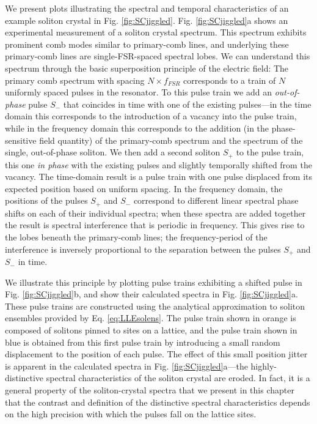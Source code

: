 We present plots illustrating the spectral and temporal characteristics of an example soliton crystal in Fig. \ref{fig:SCjiggled}. Fig. \ref{fig:SCjiggled}a shows an experimental measurement of a soliton crystal spectrum. This spectrum exhibits prominent comb modes similar to primary-comb lines, and underlying these primary-comb lines are single-FSR-spaced spectral lobes. We can understand this spectrum through the basic superposition principle of the electric field: The primary comb spectrum with spacing $N\times f_{FSR}$ corresponds to a train of $N$ uniformly spaced pulses in the resonator. To this pulse train we add an \textit{out-of-phase} pulse $S_-$ that coincides in time with one of the existing pulses---in the time domain this corresponds to the introduction of a vacancy into the pulse train, while in the frequency domain this corresponds to the addition (in the phase-sensitive field quantity) of the primary-comb spectrum and the spectrum of the single, out-of-phase soliton. We then add a second soliton $S_+$  to the pulse train, this one \textit{in phase} with the existing pulses and slightly temporally shifted from the vacancy. The time-domain result is a pulse train with one pulse displaced from its expected position based on uniform spacing. In the frequency domain, the positions of the pulses $S_+$ and $S_-$ correspond to different linear spectral phase shifts on each of their individual spectra; when these spectra are added together the result is spectral interference that is periodic in frequency. This gives rise to the lobes beneath the primary-comb lines; the frequency-period of the interference is inversely proportional to the separation between the pulses $S_+$ and $S_-$ in time.

We illustrate this principle by plotting pulse trains exhibiting a shifted pulse in Fig. \ref{fig:SCjiggled}b, and show their calculated spectra in Fig. \ref{fig:SCjiggled}a. These pulse trains are constructed using the analytical approximation to soliton ensembles provided by Eq. \ref{eq:LLEsolens}. The pulse train shown in orange is composed of solitons pinned to sites on a lattice, and the pulse train shown in blue is obtained from this first pulse train by introducing a small random displacement to the position of each pulse. The effect of this small position jitter is apparent in the calculated spectra in Fig. \ref{fig:SCjiggled}a---the highly-distinctive spectral characteristics of the soliton crystal are eroded. In fact, it is a general property of the soliton-crystal spectra that we present in this chapter that the contrast and definition of the distinctive spectral characteristics depends on the high precision with which the pulses fall on the lattice sites.


